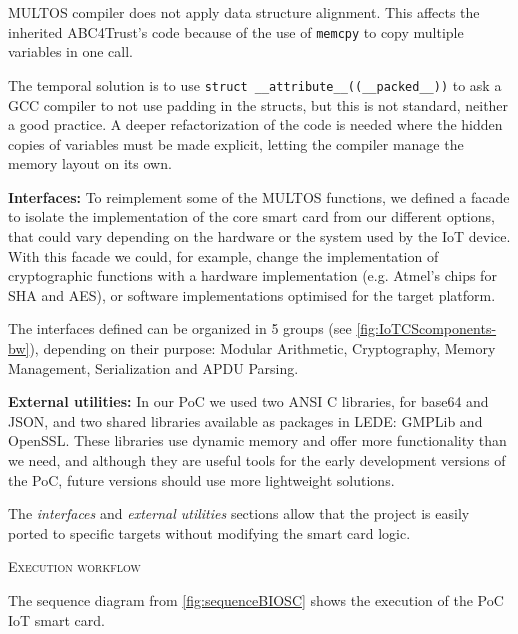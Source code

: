\documentclass[journal]{IEEEtran}
\begin{document}
MULTOS compiler does not apply data structure alignment. This affects the inherited ABC4Trust's code because of the use of \texttt{memcpy} to copy multiple variables in one call.%

The temporal solution is to use \texttt{struct \_\_attribute\_\_((\_\_packed\_\_))} to ask a GCC compiler to not use padding in the structs, but this is not standard, neither a good practice. A deeper refactorization of the code is needed where the hidden copies of variables must be made explicit, letting the compiler manage the memory layout on its own.

\hfil

\textbf{Interfaces:} To reimplement some of the MULTOS functions, we defined a facade to isolate the implementation of the core smart card from our different options, that could vary depending on the hardware or the system used by the IoT device.
With this facade we could, for example, change the implementation of cryptographic functions with a hardware implementation (e.g. Atmel's chips for SHA and AES), or software implementations optimised for the target platform.

The interfaces defined can be organized in 5 groups (see \autoref{fig:IoTCScomponents-bw}), depending on their purpose: Modular Arithmetic, Cryptography, Memory Management, Serialization and APDU Parsing.

\hfil

\textbf{External utilities:} In our PoC we used two ANSI C libraries, for base64 and JSON, and two shared libraries available as packages in LEDE: GMPLib and OpenSSL. These libraries use dynamic memory and offer more functionality than we need, and although they are useful tools for the early development versions of the PoC, future versions should use more lightweight solutions.

\hfil

The \textit{interfaces} and \textit{external utilities} sections  allow that the project is easily ported to specific targets without modifying the smart card logic.


\hfil

\textsc{Execution workflow}

The sequence diagram from \autoref{fig:sequenceBIOSC} shows the execution of the PoC IoT smart card.
\end{document}

